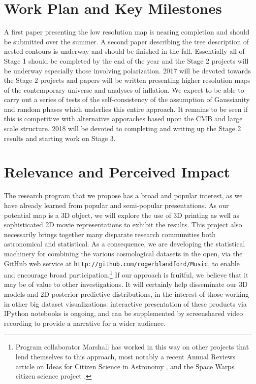 \documentclass[psfig,12pt]{article}
\begin{document}
{%

\section{Work Plan and Key Milestones}
\label{sec:plan}

A first paper presenting the low resolution map is nearing completion
and should be submitted over the summer.  A second paper describing the
tree description of nested contours is underway and should be finished
in the fall. Essentially all of Stage 1 should be completed by the end
of the year and the Stage 2 projects will be underway especially those
involving polarization. 2017 will be devoted towards the Stage 2
projects and papers will be written presenting higher resolution maps of
the contemporary universe and analyses of inflation. We expect to be
able to carry out a series of tests of the self-consistency of the
assumption of Gaussianity and random phases which underlies this entire
approach. It remains to be seen if this is competitive with alternative
apporaches based upon the CMB and large scale structure.
2018 will be devoted to completing and writing up the Stage 2 results
and starting work on Stage 3.


\section{Relevance and Perceived Impact}
\label{sec:impact}

The research program that we propose has a broad and popular interest,
as we have already learned from popular and semi-popular presentations.
As our potential map is a 3D object,
we will explore the use of 3D printing as well as sophisticated 2D movie
representations to exhibit the results. This project also necessarily
brings together many disparate research communities both astronomical
and statistical. As a consequence, we are developing the statistical
machinery for combining the various cosmological datasets in the open,
via the GitHub web service at
\texttt{http://github.com/rogerblandford/Music}, to enable and encourage
broad participation.\footnote{Program collaborator Marshall has worked in this way on other
projects that lend themselves to this approach, most notably a recent
Annual Reviews article on Ideas for Citizen Science in Astronomy
\cite{CitSciReview}, and the Space Warps citizen science project
\cite{SpaceWarps}.}
If our approach is fruitful, we believe that it may be of value to other
investigations. It will certainly help disseminate our 3D models and 2D
posterior predictive distributions, in the interest of those working in
other big dataset visualizations: interactive presentation of these
products via IPython notebooks is ongoing, and can be supplemented by
screenshared video recording to provide a narrative for a wider
audience.

}
\end{document}
